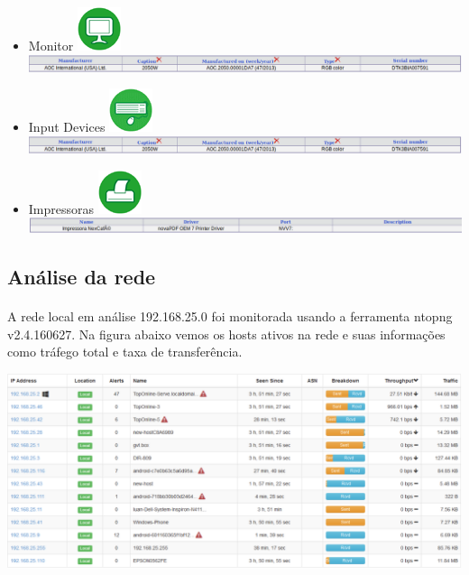 \documentclass[a4paper]{article}
\begin{document}
\begin{itemize}
    \item Monitor \includegraphics[scale = 1.8]{monitor.png}\\
  
  
  	\includegraphics[scale = 0.4]{monitore.png}
    
    \item Input Devices \includegraphics[scale = 0.45]{input.png}\\
  
  	\includegraphics[scale = 0.4]{monitore.png}
    
    \item Impressoras \includegraphics[scale = 1.8]{printer.png}\\
  
  	\includegraphics[scale = 0.4]{impress.png}
 
 \end{itemize}
 
 \subsection{Análise da rede}
 \paragraph{}
 A rede local em análise 192.168.25.0  foi monitorada usando a ferramenta ntopng v2.4.160627. 
Na figura abaixo vemos os hosts ativos na rede e suas informações como tráfego total e taxa de transferência.

\includegraphics[scale = 0.4]{ntop11.png}
\end{document}
